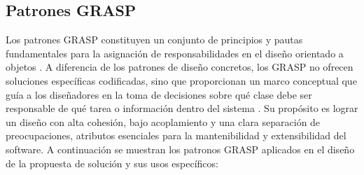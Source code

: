 \subsection{Patrones GRASP}

Los patrones \ac{GRASP} constituyen un conjunto de principios y pautas fundamentales para la 
asignación de responsabilidades en el diseño orientado a objetos \citep{larman2004applying}. A 
diferencia de los patrones de diseño concretos, los \ac{GRASP} no ofrecen soluciones específicas 
codificadas, sino que proporcionan un marco conceptual que guía a los diseñadores en la toma de 
decisiones sobre qué clase debe ser responsable de qué tarea o información dentro del sistema 
\citep{begel2020grasp}. Su propósito es lograr un diseño con alta cohesión, bajo acoplamiento y 
una clara separación de preocupaciones, atributos esenciales para la mantenibilidad y extensibilidad 
del software. A continuación se muestran los patronos \ac{GRASP} aplicados en el diseño de la 
propuesta de solución y sus usos específicos:

